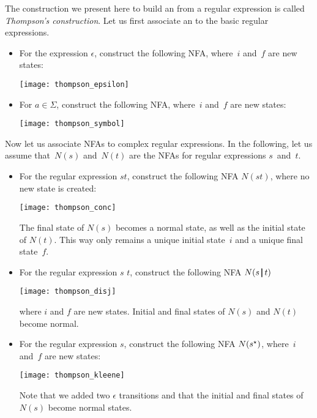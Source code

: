 The construction we present here to build an \eNFA from a regular
expression is called \emph{Thompson's construction}. Let us first
associate an \eNFA to the basic regular expressions.
\begin{itemize}

  \item For the expression \(\epsilon\), construct the following NFA,
    where~\(i\) and~\(f\) are new states:
  \begin{center}
    \texttt{[image: thompson\_epsilon]}
  \end{center}

  \item For \(a \in \Sigma\), construct the following NFA, where~\(i\)
    and~\(f\) are new states:
  \begin{center}
    \texttt{[image: thompson\_symbol]}
  \end{center}

\end{itemize}
Now let us associate NFAs to complex regular expressions. In the
following, let us assume that~\(N(s)\) and~\(N(t)\) are the NFAs for
regular expressions \(s\)~and~\(t\).
\begin{itemize}

  \item For the regular expression \(st\), construct the following NFA
    \(N(st)\), where no new state is created:
\begin{center}
\texttt{[image: thompson\_conc]}
\end{center}
  The final state of \(N(s)\) becomes a normal state, as well as the
  initial state of \(N(t)\). This way only remains a unique initial
  state~\(i\) and a unique final state~\(f\).

  \item For the regular expression \(s\) \disj \(t\), construct the
  following NFA \(N(s \, \text{\disj} \, t)\)
\begin{center} 
\texttt{[image: thompson\_disj]}
\end{center}
where \(i\) and \(f\) are new states. Initial and final
states of \(N(s)\) and \(N(t)\) become normal.

  \item For the regular expression \(s\)\kleene, construct the following
    NFA \(N(s\text{\kleene})\), where~\(i\) and~\(f\) are new
    states:
\begin{center}
\texttt{[image: thompson\_kleene]}
\end{center}
Note that we added two \(\epsilon\) transitions and that the initial
and final states of \(N(s)\) become normal states.

\end{itemize}
